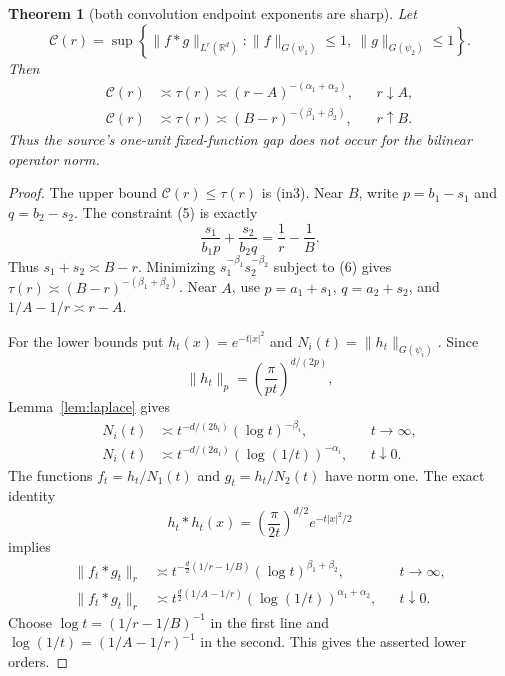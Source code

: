 \documentclass[11pt]{article}
\newtheorem{theorem}{Theorem}
\newcommand{\R}{\mathbb R}
\newcommand{\norm}[1]{\lVert#1\rVert}
\begin{document}
\begin{theorem}[both convolution endpoint exponents are sharp]\label{thm:conv}
Let
\[
 \mathcal C(r)=\sup\left\{\norm{f*g}_{L^r(\R^d)}:
 \norm f_{G(\psi_1)}\le1,\ \norm g_{G(\psi_2)}\le1\right\}.
\]
Then
\begin{align*}
 \mathcal C(r)&\asymp\tau(r)\asymp
 (r-A)^{-(\alpha_1+\alpha_2)},&&r\downarrow A,\\
 \mathcal C(r)&\asymp\tau(r)\asymp
 (B-r)^{-(\beta_1+\beta_2)},&&r\uparrow B.
\end{align*}
Thus the source's one-unit fixed-function gap does not occur for the
bilinear operator norm.
\end{theorem}

\begin{proof}
The upper bound $\mathcal C(r)\le\tau(r)$ is (in3). Near $B$, write
$p=b_1-s_1$ and $q=b_2-s_2$. The constraint (5) is exactly
\[
 \frac{s_1}{b_1p}+\frac{s_2}{b_2q}=\frac1r-\frac1B.
 \tag{6}
\]
Thus $s_1+s_2\asymp B-r$. Minimizing
$s_1^{-\beta_1}s_2^{-\beta_2}$ subject to (6) gives
$\tau(r)\asymp(B-r)^{-(\beta_1+\beta_2)}$. Near $A$, use
$p=a_1+s_1$, $q=a_2+s_2$, and $1/A-1/r\asymp r-A$.

For the lower bounds put $h_t(x)=e^{-t|x|^2}$ and
$N_i(t)=\norm{h_t}_{G(\psi_i)}$. Since
\[
 \norm{h_t}_p=\left(\frac{\pi}{pt}\right)^{d/(2p)},
\]
Lemma~\ref{lem:laplace} gives
\begin{align*}
 N_i(t)&\asymp t^{-d/(2b_i)}(\log t)^{-\beta_i},&&t\to\infty,\\
 N_i(t)&\asymp t^{-d/(2a_i)}(\log(1/t))^{-\alpha_i},&&t\downarrow0.
\end{align*}
The functions $f_t=h_t/N_1(t)$ and $g_t=h_t/N_2(t)$ have norm one.
The exact identity
\[
 h_t*h_t(x)=\left(\frac{\pi}{2t}\right)^{d/2}e^{-t|x|^2/2}
\]
implies
\begin{align*}
 \norm{f_t*g_t}_r
 &\asymp t^{-\frac d2(1/r-1/B)}
          (\log t)^{\beta_1+\beta_2},&&t\to\infty,\\
 \norm{f_t*g_t}_r
 &\asymp t^{\frac d2(1/A-1/r)}
          (\log(1/t))^{\alpha_1+\alpha_2},&&t\downarrow0.
\end{align*}
Choose $\log t=(1/r-1/B)^{-1}$ in the first line and
$\log(1/t)=(1/A-1/r)^{-1}$ in the second. This gives the asserted
lower orders.
\end{proof}
\end{document}
